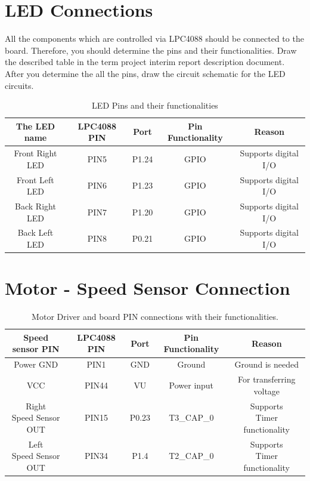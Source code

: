 \documentclass[12pt]{article}
\begin{document}
\newpage
\section{LED Connections}

All the components which are controlled via LPC4088 should be connected to the board. Therefore, you should determine the pins and their functionalities. Draw the described table in the term project interim report description document. After you determine the all the pins, draw the circuit schematic for the LED circuits. \\

\begin{center}
\begin {table}[H]
\begin{tabular}{|c|c|c|c|c|}
\hline
The LED name & LPC4088 PIN & Port & Pin Functionality & Reason \\\hline
Front Right LED & PIN5 & P1.24 & GPIO & Supports digital I/O \\\hline
Front Left LED & PIN6 & P1.23 & GPIO & Supports digital I/O \\\hline
Back Right LED & PIN7 & P1.20 & GPIO & Supports digital I/O \\\hline
Back Left LED & PIN8 & P0.21 & GPIO & Supports digital I/O \\\hline
\end{tabular}
\caption{LED Pins and their functionalities}
\end{table}
\end{center}

\newpage
\section{Motor - Speed Sensor Connection}

\begin {table}[H]
\begin{center}
\begin{tabular}{|c|c|c|c|c|}
\hline
Speed sensor PIN & LPC4088 PIN & Port & Pin Functionality & Reason \\\hline
Power GND & PIN1 & GND & Ground & Ground is needed \\\hline
VCC & PIN44 & VU & Power input & For transferring voltage \\\hline
\shortstack{Right\\ Speed Sensor \\OUT} & PIN15 & P0.23 & T3\_CAP\_0 & \shortstack{Supports\\ Timer functionality} \\\hline
\shortstack{Left\\ Speed Sensor \\OUT} & PIN34 & P1.4 & T2\_CAP\_0 & \shortstack{Supports\\ Timer functionality} \\\hline
\end{tabular}
\caption{Motor Driver and board PIN connections with their functionalities.}
\end{center}
\end{table}
\end{document}
